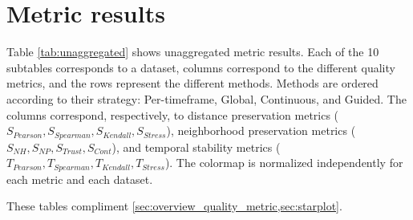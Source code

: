 \section{Metric results}

Table \ref{tab:unaggregated} shows unaggregated metric results. Each of the 10 subtables corresponds to a dataset, columns correspond to the different quality metrics, and the rows represent the different methods.
Methods are ordered according to their strategy: Per-timeframe, Global, Continuous, and Guided. 
The columns correspond, respectively, to distance preservation metrics ($S_{Pearson}, S_{Spearman}, S_{Kendall}, S_{Stress}$), neighborhood preservation metrics ($S_{NH}, S_{NP}, S_{Trust}, S_{Cont}$), and temporal stability metrics ($T_{Pearson}, T_{Spearman}, T_{Kendall}, T_{Stress}$). The colormap is normalized independently for each metric and each dataset.

These tables compliment \cref{sec:overview_quality_metric,sec:starplot}.

